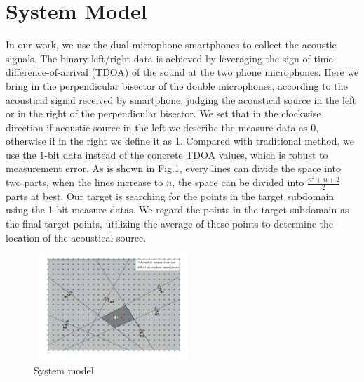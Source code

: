 \section{System Model}


In our work, we use the dual-microphone smartphones to collect the acoustic signals.
The binary left/right data is achieved by leveraging the sign of time-difference-of-arrival (TDOA) of the sound at the two phone microphones. Here we bring in the perpendicular bisector of the double microphones, according to the acoustical signal received by smartphone, judging the acoustical source in the left or in the right of the perpendicular bisector. We set that in the clockwise direction if acoustic source in the left we describe the measure data as 0, otherwise if in the right we define it as 1. Compared with traditional method, we use the 1-bit data instead of the concrete TDOA values, which is robust to measurement error.
As is shown in Fig.1, every lines can divide the space into two parts, when the lines increase to $n$, the space can be divided into $\frac{n^2+n+2}{2}$ parts at best. 
Our target is searching for the points in the target subdomain using the 1-bit measure datas. 
We regard the points in the target subdomain as the final target points, utilizing the average of these points to determine the location of the acoustical source.

  \begin{figure}[!htb]
	\centering
	\setlength{\abovecaptionskip}{-15pt}
	\vspace{-3mm}  
	\includegraphics[width=6cm,height=4.0cm]{image/b.pdf} 
	\vspace{3mm}
	\caption{System model}
	\label{fig2}
	\vspace{-5mm}
\end{figure}



